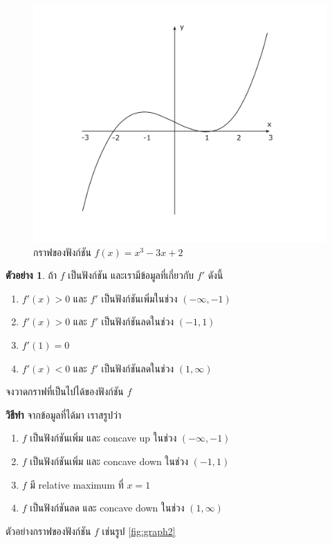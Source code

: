 \documentclass[
]{book}
\theoremstyle{definition}
\theoremstyle{definition}
\newtheorem{example}{ตัวอย่าง}[chapter]
\theoremstyle{definition}
\theoremstyle{definition}
\theoremstyle{remark}
\begin{document}
\begin{figure}

{\centering \includegraphics[width=0.5\linewidth]{images/graph1} 

}

\caption{กราฟของฟังก์ชัน $f(x) =  x^3 - 3x + 2$}\label{fig:fig-graph1}
\end{figure}

\begin{example}
ถ้า \(f\) เป็นฟังก์ชัน และเรามีข้อมูลที่เกี่ยวกับ \(f'\) ดังนี้

\begin{enumerate}
\def\labelenumi{\arabic{enumi}.}
\item
  \(f'(x) > 0\) และ \(f'\) เป็นฟังก์ชันเพิ่มในช่วง \((-\infty, -1)\)
\item
  \(f'(x) > 0\) และ \(f'\) เป็นฟังก์ชันลดในช่วง \((-1,1)\)
\item
  \(f'(1) = 0\)
\item
  \(f'(x) < 0\) และ \(f'\) เป็นฟังก์ชันลดในช่วง \((1,\infty)\)
\end{enumerate}

จงวาดกราฟที่เป็นไปได้ของฟังก์ชัน \(f\)
\end{example}

\textbf{วิธีทำ} จากข้อมูลที่ได้มา เราสรูปว่า

\begin{enumerate}
\def\labelenumi{\arabic{enumi}.}
\item
  \(f\) เป็นฟังก์ชันเพิ่ม และ concave up ในช่วง \((-\infty,-1)\)
\item
  \(f\) เป็นฟังก์ชันเพิ่ม และ concave down ในช่วง \((-1,1)\)
\item
  \(f\) มี relative maximum ที่ \(x=1\)
\item
  \(f\) เป็นฟังก์ชันลด และ concave down ในช่วง \((1,\infty)\)
\end{enumerate}

ตัวอย่างกราฟของฟังก์ชัน \(f\) เช่นรูป \ref{fig:graph2}
\end{document}
